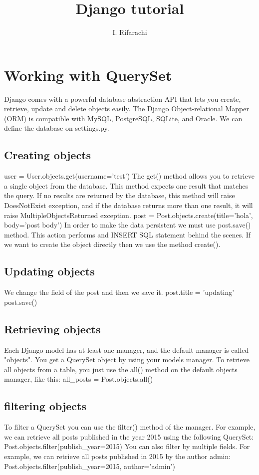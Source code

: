 \documentclass[12pt]{article}
\title{Django tutorial}
\author{I. Rifarachi}
\begin{document}
\maketitle


\section{Working with QuerySet}

Django comes with a powerful database-abstraction API that lets you create,
retrieve, update and delete objects easily. The Django Object-relational Mapper
(ORM) is compatible with MySQL, PostgreSQL, SQLite, and Oracle. We can define
the database on settings.py.

\subsection{Creating objects}
user = User.objects.get(username='test')
The get() method allows you to retrieve a single object from the database. This
method expects one result that matches the query. If no results are returned by
the database, this method will raise DoesNotExist exception, and if the
database returns more than one result, it will raise MultipleObjectsReturned
exception.
post = Post.objects.create(title='hola', body='post body')
In order to make the data persistent we must use post.save() method. This
action performs and INSERT SQL statement behind the scenes. If we want to
create the object directly then we use the method create().

\subsection{Updating objects}
We change the field of the post and then we save it.
post.title = 'updating'
post.save()

\subsection{Retrieving objects}
Each Django model has at least one manager, and the default manager is called
"objects". You get a QuerySet object by using your models manager. To retrieve
all objects from a table, you just use the all() method on the default objects
manager, like this:
all_posts = Post.objects.all()

\subsection{filtering objects}
To filter a QuerySet you can use the filter() method of the manager. For
example, we can retrieve all posts published in the year 2015 using the
following QuerySet:
Post.objects.filter(publish_year=2015)
You can also filter by multiple fields. For example, we can retrieve all posts
published in 2015 by the author admin:
Post.objects.filter(publish_year=2015, author='admin')
\end{document}
